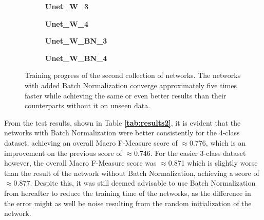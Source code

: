 \begin {figure}[!ht]
	\begin {subfigure}[b]{0.4\linewidth}
		\scalebox{0.65}{}
		\caption{\textbf{Unet\_W\_3}}
	\end {subfigure}\hspace{1.75cm}
	\begin {subfigure}[b]{0.4\linewidth}
		\scalebox{0.65}{}
		\caption{\textbf{Unet\_W\_4}}
	\end {subfigure}

	\begin {subfigure}[b]{0.4\linewidth}
		\scalebox{0.65}{}
		\caption{\textbf{Unet\_W\_BN\_3}}
	\end {subfigure}\hspace{1.75cm}
	\begin {subfigure}[b]{0.4\linewidth}
		\scalebox{0.65}{}
		\caption{\textbf{Unet\_W\_BN\_4}}
	\end {subfigure}

		\caption[Training progress of the second collection of networks.]{Training progress of the second collection of networks. The networks with added Batch Normalization converge approximately five times faster while achieving the same or even better results than their counterparts without it on unseen data.}
		\label{fig:weighted_weighted_batchnorm_training}
\end {figure}

\noindent From the test results, shown in Table \textbf{\ref{tab:results2}}, it is evident that the networks with Batch Normalization were better consistently for the 4-class dataset, achieving an overall Macro F-Measure score of $\approx$0.776, which is an improvement on the previous score of $\approx$0.746. For the easier 3-class dataset however, the overall Macro F-Measure score was $\approx$0.871 which is slightly worse than the result of the network without Batch Normalization, achieving a score of $\approx$0.877. Despite this, it was still deemed advisable to use Batch Normalization from hereafter to reduce the training time of the networks, as the difference in the error might as well be noise resulting from the random initialization of the network.\\

